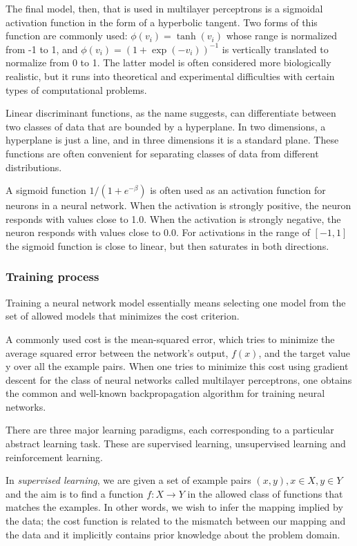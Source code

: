 \documentclass[a4paper,12pt]{article}
\begin{document}
The final model, then, that is used in multilayer perceptrons is a sigmoidal activation function in the form of a hyperbolic tangent. Two forms of this function are commonly used: $\phi(v_i)=\tanh(v_i)$ whose range is normalized from -1 to 1, and $\phi(v_i) = (1+\exp(-v_i))^{-1}$ is vertically translated to normalize from 0 to 1. The latter model is often considered more biologically realistic, but it runs into theoretical and experimental difficulties with certain types of computational problems.

Linear discriminant functions, as the name suggests, can differentiate between two classes of data that are bounded by a hyperplane. In two dimensions, a hyperplane is just a line, and in three dimensions it is a standard plane. These functions are often convenient for separating classes of data from different distributions\cite{nn}.

A sigmoid function $1/(1 + e^{-\beta} )$ is often used as an activation function for neurons in a neural network. When the activation is strongly positive, the neuron responds with values close to 1.0. When the activation is strongly negative, the neuron responds with values close to 0.0. For activations in the range of $[-1 ,1]$ the sigmoid function is close to linear, but then saturates in both directions.\cite{nn}

\subsubsection{Training process}

Training a neural network model essentially means selecting one model from the set of allowed models that minimizes the cost criterion.

A commonly used cost is the mean-squared error, which tries to minimize the average squared error between the network's output, $f(x)$, and the target value y over all the example pairs. When one tries to minimize this cost using gradient descent for the class of neural networks called multilayer perceptrons, one obtains the common and well-known backpropagation algorithm for training neural networks.

There are three major learning paradigms, each corresponding to a particular abstract learning task. These are supervised learning, unsupervised learning and reinforcement learning.

In \emph{supervised learning}, we are given a set of example pairs $ (x, y), x \in X, y \in Y $ and the aim is to find a function $ f : X \rightarrow Y $ in the allowed class of functions that matches the examples. In other words, we wish to infer the mapping implied by the data; the cost function is related to the mismatch between our mapping and the data and it implicitly contains prior knowledge about the problem domain.
\end{document}
